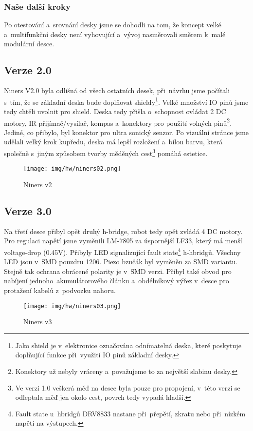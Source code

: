 \subsubsection{Naše další kroky}
Po otestování a~srovnání desky jsme se dohodli na tom, že koncept velké a~multifunkční desky není vyhovující a~vývoj nasměrovali směrem k~malé modulární desce.

\subsection{Verze 2.0}
Niners V2.0 byla odlišná od všech ostatních desek, při~návrhu jsme počítali s~tím, že se základní deska bude doplňovat shieldy\footnote{Jako shield je v~elektronice označována odnímatelná deska, které poskytuje doplňující funkce při~využití IO pinů základní desky.}. Velké množství IO pinů jsme tedy chtěli uvolnit pro shield. Deska tedy přišla o~schopnost ovládat 2 DC motory, IR přijímač/vysílač, kompas a~konektory pro použití volných pinů\footnote{Konektory už nebyly vráceny a~považujeme to za největší slabinu desky.}. Jediné, co přibylo, byl konektor pro ultra sonický senzor. Po vizuální stránce jsme udělali velký krok kupředu, deska má lepší rozložení a~bílou barvu, která společně s~jiným způsobem tvorby měděných cest\footnote{Ve verzi 1.0 veškerá měď na desce byla pouze pro propojení, v~této verzi se odleptala měď jen okolo cest, povrch tedy vypadá hladší.} pomáhá estetice.
\begin{figure}[H]
  	\centering
 	\texttt{[image: img/hw/niners02.png]}
 	\caption{Niners v2}
\end{figure}
\newpage
\subsection{Verze 3.0}
Na třetí desce přibyl opět druhý h-bridge, robot tedy opět zvládá 4 DC motory. Pro regulaci napětí jsme vyměnili LM-7805 za úspornější LF33\cite{LF33-RoboDoupe}, který má menší voltage-drop (0.45V)\cite{LF33}. Přibyly LED signalizující fault state\footnote{Fault state u~hbridgů DRV8833\cite{DRV8833} nastane při~přepětí, zkratu nebo při~nízkém napětí na výstupech. } h-hbridgů. Všechny LED jsou v~SMD pouzdru 1206. Piezo bzučák byl vyměněn za SMD variantu. Stejně tak ochrana obrácené polarity je v~SMD verzi. Přibyl také obvod pro nabíjení jednoho~akumulátorového článku a~obdélníkový výřez v~desce pro protažení kabelů z~podvozku nahoru.
\begin{figure}[H]
  	\centering
 	\texttt{[image: img/hw/niners03.png]}
 	\caption{Niners v3}
\end{figure}
\newpage
